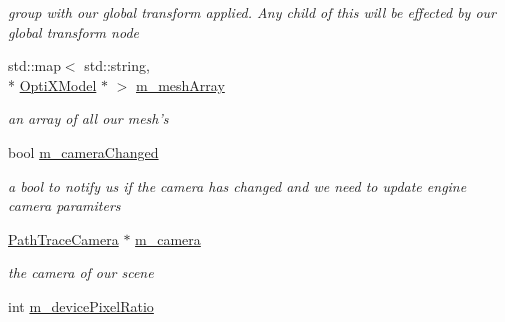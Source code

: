 \begin{DoxyCompactItemize}
\begin{DoxyCompactList}\small\item\em group with our global transform applied. Any child of this will be effected by our global transform node \end{DoxyCompactList}\item 
\hypertarget{class_path_tracer_scene_ae08f725aa3672880d604626f62f30f00}{std\-::map$<$ std\-::string, \\*
\hyperlink{class_opti_x_model}{Opti\-X\-Model} $\ast$ $>$ \hyperlink{class_path_tracer_scene_ae08f725aa3672880d604626f62f30f00}{m\-\_\-mesh\-Array}}\label{class_path_tracer_scene_ae08f725aa3672880d604626f62f30f00}

\begin{DoxyCompactList}\small\item\em an array of all our mesh's \end{DoxyCompactList}\item 
\hypertarget{class_path_tracer_scene_a6f3e75d8f6d34c894eca866d2f4543c8}{bool \hyperlink{class_path_tracer_scene_a6f3e75d8f6d34c894eca866d2f4543c8}{m\-\_\-camera\-Changed}}\label{class_path_tracer_scene_a6f3e75d8f6d34c894eca866d2f4543c8}

\begin{DoxyCompactList}\small\item\em a bool to notify us if the camera has changed and we need to update engine camera paramiters \end{DoxyCompactList}\item 
\hypertarget{class_path_tracer_scene_adc71b6fbee66993aa7ee8f75c417c061}{\hyperlink{class_path_trace_camera}{Path\-Trace\-Camera} $\ast$ \hyperlink{class_path_tracer_scene_adc71b6fbee66993aa7ee8f75c417c061}{m\-\_\-camera}}\label{class_path_tracer_scene_adc71b6fbee66993aa7ee8f75c417c061}

\begin{DoxyCompactList}\small\item\em the camera of our scene \end{DoxyCompactList}\item 
\hypertarget{class_path_tracer_scene_ae2ad01374166effa0627944f8a866517}{int \hyperlink{class_path_tracer_scene_ae2ad01374166effa0627944f8a866517}{m\-\_\-device\-Pixel\-Ratio}}\label{class_path_tracer_scene_ae2ad01374166effa0627944f8a866517}


\end{DoxyCompactItemize}
